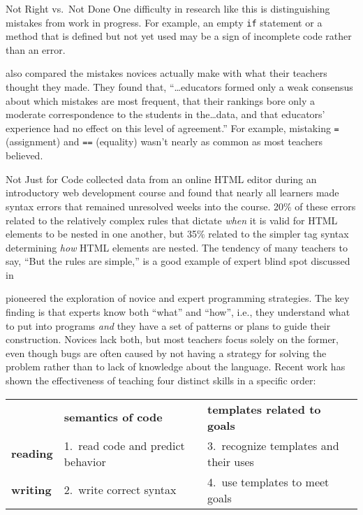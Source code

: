 \begin{aside}{Not Right vs.\ Not Done}
  One difficulty in research like this is distinguishing mistakes from work in progress.
  For example,
  an empty \texttt{if} statement or a method that is defined but not yet used
  may be a sign of incomplete code rather than an error.
\end{aside}

\cite{Brow2017} also compared the mistakes novices actually make
with what their teachers thought they made.
They found that,
``{\ldots}educators formed only a weak consensus about which mistakes are most frequent,
that their rankings bore only a moderate correspondence to the students in the{\ldots}data,
and that educators' experience had no effect on this level of agreement.''
For example,
mistaking \texttt{=} (assignment) and \texttt{==} (equality)
wasn't nearly as common as most teachers believed.

\begin{aside}{Not Just for Code}
  \cite{Park2015} collected data from an online HTML editor during an introductory web development course
  and found that nearly all learners made syntax errors that remained unresolved weeks into the course.
  20\% of these errors related to the relatively complex rules
  that dictate \emph{when} it is valid for HTML elements to be nested in one another,
  but 35\% related to the simpler tag syntax determining \emph{how} HTML elements are nested.
  The tendency of many teachers to say,
  ``But the rules are simple,''
  is a good example of expert blind spot discussed in 
\end{aside}


\cite{Solo1984,Solo1986} pioneered the exploration of novice and expert programming strategies.
The key finding is that experts know both ``what'' and ``how'',
i.e.,
they understand what to put into programs
\emph{and} they have a set of patterns or plans to guide their construction.
Novices lack both,
but most teachers focus solely on the former,
even though bugs are often caused by not having a strategy for solving the problem
rather than to lack of knowledge about the language.
Recent work has shown the effectiveness of teaching four distinct skills in a specific order:

\begin{longtable}{lll}
		        & \textbf{semantics of code}   		& \textbf{templates related to goals} \\
\textbf{reading}	& 1.\ read code and predict behavior	& 3.\ recognize templates and their uses \\
\textbf{writing}	& 2.\ write correct syntax		& 4.\ use templates to meet goals
\end{longtable}

